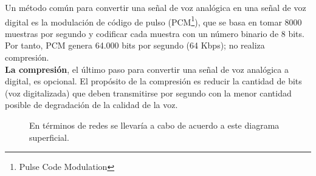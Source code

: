\begin{enumerate}
Un método común para convertir una señal de voz analógica en una señal de voz digital es la modulación de código de pulso (PCM\footnote{Pulse Code Modulation}), que se basa en tomar 8000 muestras por segundo y codificar cada muestra con un número binario de 8 bits. Por tanto, PCM genera 64.000 bits por segundo (64 Kbps); no realiza compresión. \\

\textbf{La compresión}, el último paso para convertir una señal de voz analógica a digital, es opcional. El propósito de la compresión es reducir la cantidad de bits (voz digitalizada) que deben transmitirse por segundo con la menor cantidad posible de degradación de la calidad de la voz.

\begin{figure}[ht!]
\caption{En términos de redes se llevaría a cabo de acuerdo a este diagrama superficial.}
\end{figure}


\end{enumerate}


